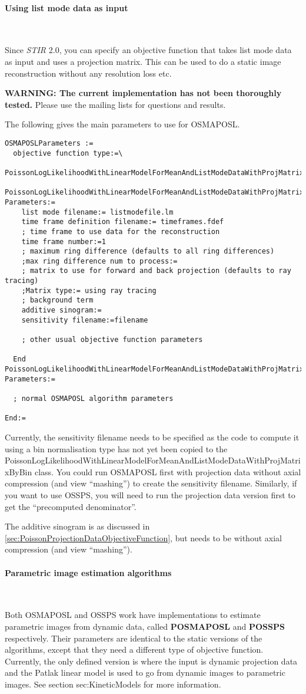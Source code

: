 \documentclass{article}
\newcommand{\subsubsubsection}[1]{\paragraph{#1}\mbox{} \\}
\begin{document}
{ \subsubsubsection{Using list mode data as input}
}
\label{sec:ListmodeIterativeAlgorithms}
Since \textit{STIR} 2.0, you can specify an objective function that takes list mode data as input
and uses a projection matrix. This can be used to do a static image reconstruction
without any resolution loss etc. 

\textbf{WARNING: The current implementation has not been thoroughly tested.} Please use
the mailing lists for questions and results.

The following gives the main parameters to use for OSMAPOSL.
{ \small
\begin{verbatim}
OSMAPOSLParameters :=
  objective function type:=\
     PoissonLogLikelihoodWithLinearModelForMeanAndListModeDataWithProjMatrixByBin
  PoissonLogLikelihoodWithLinearModelForMeanAndListModeDataWithProjMatrixByBin Parameters:=
    list mode filename:= listmodefile.lm
    time frame definition filename:= timeframes.fdef
    ; time frame to use data for the reconstruction
    time frame number:=1
    ; maximum ring difference (defaults to all ring differences)
    ;max ring difference num to process:=
    ; matrix to use for forward and back projection (defaults to ray tracing)
    ;Matrix type:= using ray tracing
    ; background term
    additive sinogram:=
    sensitivity filename:=filename

    ; other usual objective function parameters 

  End PoissonLogLikelihoodWithLinearModelForMeanAndListModeDataWithProjMatrixByBin Parameters:=

  ; normal OSMAPOSL algorithm parameters 

End:=
\end{verbatim}
}

Currently, the sensitivity filename needs to be specified as the code to compute it using
a bin normalisation type has not yet been copied to the 
PoissonLogLikelihoodWithLinearModelForMeanAndListModeDataWithProjMatrixByBin
class. You could run OSMAPOSL first with projection data without axial compression (and view
``mashing'') to create the sensitivity filename. Similarly, if you want to use OSSPS,
you will need to run the projection data version first to get the ``precomputed denominator''.

The additive sinogram is as discussed in \ref{sec:PoissonProjectionDataObjectiveFunction}, 
but needs to be without axial compression (and view ``mashing'').

{ \subsubsubsection{Parametric image estimation algorithms}
}
\label{sec:ParametricImageIterativeAlgorithms}
Both OSMAPOSL and OSSPS work have implementations to estimate parametric images from
dynamic data, called \textbf{POSMAPOSL} and \textbf{POSSPS} respectively. 
Their parameters are identical to the static versions of the algorithms, except that
they need a different type of objective function. Currently, the only defined version is
where the input is dynamic projection data and the Patlak linear model is used to go from
dynamic images to parametric images. See section {sec:KineticModels} for more information.
\end{document}
